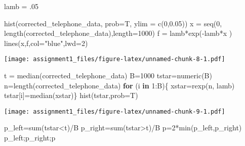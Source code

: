 \documentclass[
]{article}
\newenvironment{Shaded}{\begin{snugshade}}{\end{snugshade}}
\newcommand{\AttributeTok}[1]{\textcolor[rgb]{0.77,0.63,0.00}{#1}}
\newcommand{\ControlFlowTok}[1]{\textcolor[rgb]{0.13,0.29,0.53}{\textbf{#1}}}
\newcommand{\DecValTok}[1]{\textcolor[rgb]{0.00,0.00,0.81}{#1}}
\newcommand{\FloatTok}[1]{\textcolor[rgb]{0.00,0.00,0.81}{#1}}
\newcommand{\FunctionTok}[1]{\textcolor[rgb]{0.00,0.00,0.00}{#1}}
\newcommand{\NormalTok}[1]{#1}
\newcommand{\OtherTok}[1]{\textcolor[rgb]{0.56,0.35,0.01}{#1}}
\newcommand{\SpecialCharTok}[1]{\textcolor[rgb]{0.00,0.00,0.00}{#1}}
\newcommand{\StringTok}[1]{\textcolor[rgb]{0.31,0.60,0.02}{#1}}
\begin{document}
\begin{Shaded}
\begin{Highlighting}[]
\NormalTok{lamb }\OtherTok{=}\NormalTok{ .}\DecValTok{05}

\FunctionTok{hist}\NormalTok{(corrected\_telephone\_data, }\AttributeTok{prob=}\NormalTok{T, }\AttributeTok{ylim =} \FunctionTok{c}\NormalTok{(}\DecValTok{0}\NormalTok{,}\FloatTok{0.05}\NormalTok{))}
\NormalTok{x }\OtherTok{=} \FunctionTok{seq}\NormalTok{(}\DecValTok{0}\NormalTok{, }\FunctionTok{length}\NormalTok{(corrected\_telephone\_data),}\AttributeTok{length=}\DecValTok{1000}\NormalTok{)}
\NormalTok{f }\OtherTok{=}\NormalTok{ lamb}\SpecialCharTok{*}\FunctionTok{exp}\NormalTok{(}\SpecialCharTok{{-}}\NormalTok{lamb}\SpecialCharTok{*}\NormalTok{x )}
\FunctionTok{lines}\NormalTok{(x,f,}\AttributeTok{col=}\StringTok{"blue"}\NormalTok{,}\AttributeTok{lwd=}\DecValTok{2}\NormalTok{)}
\end{Highlighting}
\end{Shaded}

\texttt{[image: assignment1\_files/figure-latex/unnamed-chunk-8-1.pdf]}

\begin{Shaded}
\begin{Highlighting}[]
\NormalTok{t }\OtherTok{=} \FunctionTok{median}\NormalTok{(corrected\_telephone\_data)}
\NormalTok{B}\OtherTok{=}\DecValTok{1000}
\NormalTok{tstar}\OtherTok{=}\FunctionTok{numeric}\NormalTok{(B)}
\NormalTok{n}\OtherTok{=}\FunctionTok{length}\NormalTok{(corrected\_telephone\_data)}
\ControlFlowTok{for}\NormalTok{ (i }\ControlFlowTok{in} \DecValTok{1}\SpecialCharTok{:}\NormalTok{B)\{}
\NormalTok{  xstar}\OtherTok{=}\FunctionTok{rexp}\NormalTok{(n, lamb)}
\NormalTok{  tstar[i]}\OtherTok{=}\FunctionTok{median}\NormalTok{(xstar)\}}
  \FunctionTok{hist}\NormalTok{(tstar,}\AttributeTok{prob=}\NormalTok{T)}
\end{Highlighting}
\end{Shaded}

\texttt{[image: assignment1\_files/figure-latex/unnamed-chunk-9-1.pdf]}

\begin{Shaded}
\begin{Highlighting}[]
\NormalTok{p\_left}\OtherTok{=}\FunctionTok{sum}\NormalTok{(tstar}\SpecialCharTok{\textless{}}\NormalTok{t)}\SpecialCharTok{/}\NormalTok{B}
\NormalTok{p\_right}\OtherTok{=}\FunctionTok{sum}\NormalTok{(tstar}\SpecialCharTok{\textgreater{}}\NormalTok{t)}\SpecialCharTok{/}\NormalTok{B}
\NormalTok{p}\OtherTok{=}\DecValTok{2}\SpecialCharTok{*}\FunctionTok{min}\NormalTok{(p\_left,p\_right)}
\NormalTok{p\_left;p\_right;p}
\end{Highlighting}
\end{Shaded}
\end{document}
